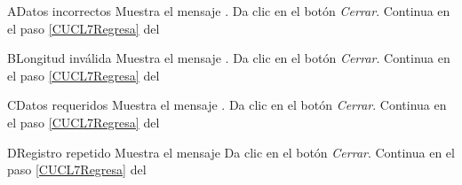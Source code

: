 
\begin{UCtrayectoriaA}{A}{Datos incorrectos}
	\UCpaso Muestra el mensaje . 
	\UCpaso[\UCactor] Da clic en el botón \textit{Cerrar}.
	\UCpaso[\UCactor] Continua en el paso \ref{CUCL7Regresa} del 

\end{UCtrayectoriaA} 

\begin{UCtrayectoriaA}{B}{Longitud inválida}
	\UCpaso Muestra el mensaje . 
	\UCpaso[\UCactor] Da clic en el botón \textit{Cerrar}.
	\UCpaso[\UCactor] Continua en el paso \ref{CUCL7Regresa} del 

\end{UCtrayectoriaA}

\begin{UCtrayectoriaA}{C}{Datos requeridos}
	\UCpaso Muestra el mensaje . 
	\UCpaso[\UCactor] Da clic en el botón \textit{Cerrar}.
	\UCpaso[\UCactor] Continua en el paso \ref{CUCL7Regresa} del 

\end{UCtrayectoriaA}

\begin{UCtrayectoriaA}{D}{Registro repetido}
	\UCpaso Muestra el mensaje   
	\UCpaso[\UCactor] Da clic en el botón \textit{Cerrar}.
	\UCpaso[\UCactor] Continua en el paso \ref{CUCL7Regresa} del 

\end{UCtrayectoriaA}


		
